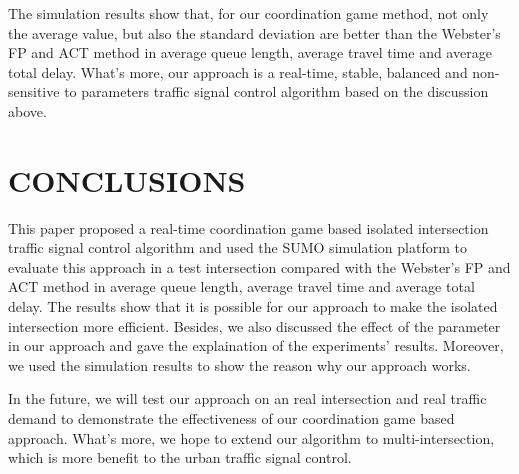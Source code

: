 \documentclass[a4paper, 10pt, conference]{ieeeconf}      %
\begin{document}
The simulation results show that, for our coordination game method, not only the average value, but also the standard deviation are 
better than the Webster's FP and ACT method in average queue length, average travel time and average total delay. What's more, our approach
is a real-time, stable, balanced and non-sensitive to parameters traffic signal control algorithm based on the discussion above. 



\section{CONCLUSIONS}

This paper proposed a real-time coordination game based isolated intersection traffic signal control algorithm and used the SUMO simulation platform 
to evaluate this approach in a test intersection compared with the Webster's FP and ACT method in average queue length, average travel time 
and average total delay. The results show that it is possible for our approach to make the isolated intersection more efficient. Besides, 
we also discussed the effect of the parameter in our approach and gave the explaination of the experiments' results. Moreover,
we used the simulation results to show the reason why our approach works. 

In the future, we will test our approach on an real intersection and real traffic demand to demonstrate the effectiveness of our coordination
game based approach. What's more, we hope to extend our algorithm to multi-intersection, which is more benefit to the urban traffic signal control.


\addtolength{\textheight}{-12cm}   %












\end{document}
